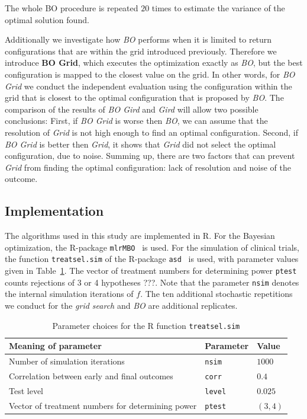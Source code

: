 \documentclass[bimj,fleqn]{w-art}
\theoremstyle{plain}
\theoremstyle{definition}
\begin{document}
The whole BO procedure is repeated $20$ times to estimate the variance of the optimal solution found.

Additionally we investigate how \emph{BO} performs when it is limited to return configurations that are within the grid introduced previously.
Therefore we introduce \textbf{BO Grid}, which executes the optimization exactly as \emph{BO}, but the best configuration is mapped to the closest value on the grid. 
In other words, for \emph{BO Grid} we conduct the independent evaluation using the configuration within the grid that is closest to the optimal configuration that is proposed by \emph{BO}.
The comparison of the results of \emph{BO Gird} and \emph{Gird} will allow two possible conclusions:
First, if \emph{BO Grid} is worse then \emph{BO}, we can assume that the resolution of \emph{Grid} is not high enough to find an optimal configuration.
Second, if \emph{BO Grid} is better then \emph{Grid}, it shows that \emph{Grid} did not select the optimal configuration, due to noise.
Summing up, there are two factors that can prevent \emph{Grid} from finding the optimal configuration: lack of resolution and noise of the outcome.

\subsection{Implementation}

The algorithms used in this study are implemented in R.
For the Bayesian optimization, the R-package \texttt{mlrMBO}~\citep{bischl_mlrmbo_2017} is used.
For the simulation of clinical trials, the function \texttt{treatsel.sim} of the R-package \texttt{asd}~\citep{parsons_software_2011} is used, with parameter values given in Table~\ref{tab:par_implement}.
The vector of treatment numbers for determining power \texttt{ptest} counts rejections of 3 or 4 hypotheses ???.
Note that the parameter \texttt{nsim} denotes the internal simulation iterations of $f$. 
The ten additional stochastic repetitions we conduct for the \emph{grid search} and \emph{BO} are additional replicates.


\begin{table}[h]
  \caption{Parameter choices for the R function \texttt{treatsel.sim}}
  \label{tab:par_implement}
  \centering
  \begin{tabular}{lll}
  \hline
  Meaning of parameter & Parameter & Value \\
  \hline
  Number of simulation iterations & \texttt{nsim} & $1000$ \\
  Correlation between early and final outcomes & \texttt{corr} & $0.4$ \\
  Test level & \texttt{level} & $0.025$ \\
  Vector of treatment numbers for determining power & \texttt{ptest} & $(3,4)$ \\
  \hline
  \end{tabular}
\end{table}
\end{document}

